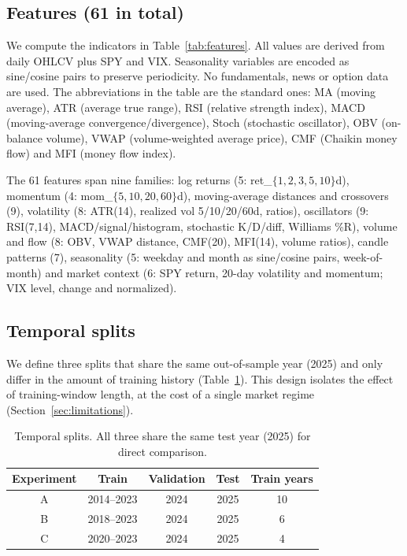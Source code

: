 \documentclass[runningheads]{llncs}
\begin{document}
\subsection{Features (61 in total)}

We compute the indicators in Table~\ref{tab:features}. All values are derived from daily OHLCV plus SPY and VIX. Seasonality variables are encoded as sine/cosine pairs to preserve periodicity. No fundamentals, news or option data are used. The abbreviations in the table are the standard ones: MA (moving average), ATR (average true range), RSI (relative strength index), MACD (moving-average convergence/divergence), Stoch (stochastic oscillator), OBV (on-balance volume), VWAP (volume-weighted average price), CMF (Chaikin money flow) and MFI (money flow index).

The 61 features span nine families: log returns (5: ret\_$\{1,2,3,5,10\}$d),
momentum (4: mom\_$\{5,10,20,60\}$d), moving-average distances and crossovers
(9), volatility (8: ATR(14), realized vol 5/10/20/60d, ratios), oscillators (9:
RSI(7,14), MACD/signal/histogram, stochastic K/D/diff, Williams \%R), volume and
flow (8: OBV, VWAP distance, CMF(20), MFI(14), volume ratios), candle patterns
(7), seasonality (5: weekday and month as sine/cosine pairs, week-of-month) and
market context (6: SPY return, 20-day volatility and momentum; VIX level, change
and normalized).

\subsection{Temporal splits}

We define three splits that share the same out-of-sample year (2025) and only differ in the amount of training history (Table~\ref{tab:splits}). This design isolates the effect of training-window length, at the cost of a single market regime (Section~\ref{sec:limitations}).

\begin{table}[t]
\centering
\caption{Temporal splits. All three share the same test year (2025) for direct comparison.}
\label{tab:splits}
\begin{tabular}{ccccc}
\toprule
Experiment & Train & Validation & Test & Train years \\
\midrule
A & 2014--2023 & 2024 & 2025 & 10 \\
B & 2018--2023 & 2024 & 2025 & 6 \\
C & 2020--2023 & 2024 & 2025 & 4 \\
\bottomrule
\end{tabular}
\end{table}
\end{document}
